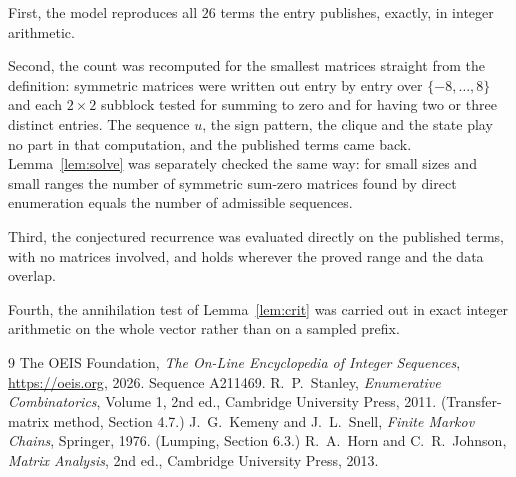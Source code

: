 \documentclass[11pt,a4paper]{article}
\theoremstyle{plain}
\theoremstyle{definition}
\begin{document}
First, the model reproduces all $26$ terms the entry publishes, exactly, in integer
arithmetic.

Second, the count was recomputed for the smallest matrices straight from the definition:
symmetric matrices were written out entry by entry over $\{-8,\dots,8\}$ and each
$2\times2$ subblock tested for summing to zero and for having two or three distinct entries. The
sequence $u$, the sign pattern, the clique and the state play no part in that computation, and
the published terms came back. Lemma~\ref{lem:solve} was separately checked the same way: for
small sizes and small ranges the number of symmetric sum-zero matrices found by direct
enumeration equals the number of admissible sequences.

Third, the conjectured recurrence was evaluated directly on the published terms, with no
matrices involved, and holds wherever the proved range and the data overlap.

Fourth, the annihilation test of Lemma~\ref{lem:crit} was carried out in exact integer
arithmetic on the whole vector rather than on a sampled prefix.

\begin{thebibliography}{9}
 The OEIS Foundation, \emph{The On-Line Encyclopedia of Integer
Sequences}, \url{https://oeis.org}, 2026. Sequence A211469.
 R.~P.~Stanley, \emph{Enumerative Combinatorics}, Volume 1, 2nd ed.,
Cambridge University Press, 2011. (Transfer-matrix method, Section 4.7.)
 J.~G.~Kemeny and J.~L.~Snell, \emph{Finite Markov Chains}, Springer, 1976.
(Lumping, Section 6.3.)
 R.~A.~Horn and C.~R.~Johnson, \emph{Matrix Analysis}, 2nd ed., Cambridge
University Press, 2013.
\end{thebibliography}
\end{document}
